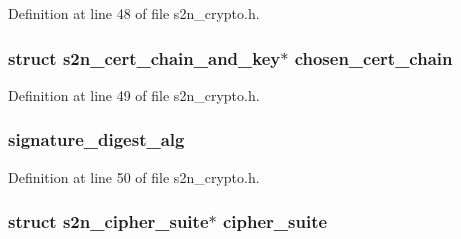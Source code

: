 Definition at line 48 of file s2n\+\_\+crypto.\+h.

\subsubsection[{\texorpdfstring{chosen\+\_\+cert\+\_\+chain}{chosen_cert_chain}}]{\setlength{\rightskip}{0pt plus 5cm}struct {\bf s2n\+\_\+cert\+\_\+chain\+\_\+and\+\_\+key}$\ast$ chosen\+\_\+cert\+\_\+chain}\hypertarget{structs2n__crypto__parameters_a20dd75e38ae2f99535e509425e4dface}{}\label{structs2n__crypto__parameters_a20dd75e38ae2f99535e509425e4dface}


Definition at line 49 of file s2n\+\_\+crypto.\+h.

\subsubsection[{\texorpdfstring{signature\+\_\+digest\+\_\+alg}{signature_digest_alg}}]{ signature\+\_\+digest\+\_\+alg}\hypertarget{structs2n__crypto__parameters_a76195ad1b96e7ecdec22ee893d81c6c7}{}\label{structs2n__crypto__parameters_a76195ad1b96e7ecdec22ee893d81c6c7}


Definition at line 50 of file s2n\+\_\+crypto.\+h.

\subsubsection[{\texorpdfstring{cipher\+\_\+suite}{cipher_suite}}]{\setlength{\rightskip}{0pt plus 5cm}struct {\bf s2n\+\_\+cipher\+\_\+suite}$\ast$ cipher\+\_\+suite}\hypertarget{structs2n__crypto__parameters_a5446cce0337d14b74b38f2a81ea19670}{}\label{structs2n__crypto__parameters_a5446cce0337d14b74b38f2a81ea19670}


